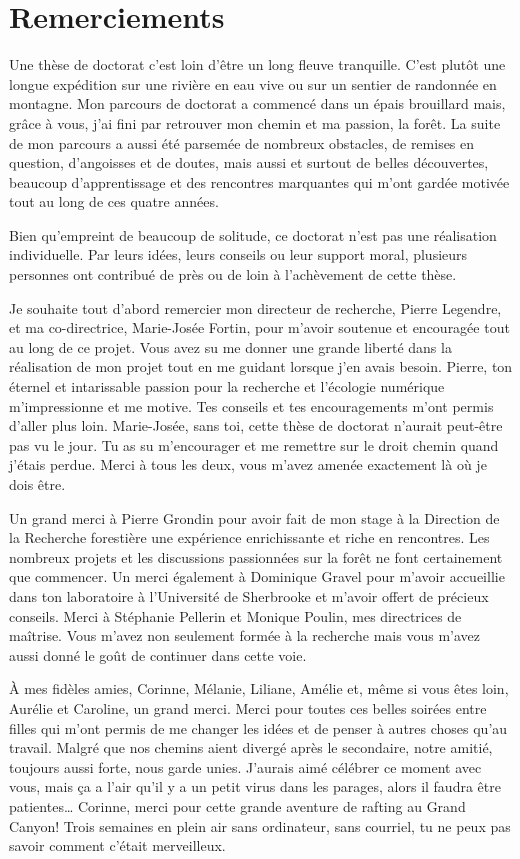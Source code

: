\francais

\chapter*{Remerciements}

Une thèse de doctorat c'est loin d'être un long fleuve tranquille. C'est
plutôt une longue expédition sur une rivière en eau vive ou sur un
sentier de randonnée en montagne. Mon parcours de doctorat a commencé
dans un épais brouillard mais, grâce à vous, j'ai fini par retrouver mon
chemin et ma passion, la forêt. La suite de mon parcours a aussi été
parsemée de nombreux obstacles, de remises en question, d'angoisses et
de doutes, mais aussi et surtout de belles découvertes, beaucoup
d'apprentissage et des rencontres marquantes qui m'ont gardée motivée
tout au long de ces quatre années.

Bien qu'empreint de beaucoup de solitude, ce doctorat n'est pas une
réalisation individuelle. Par leurs idées, leurs conseils ou leur
support moral, plusieurs personnes ont contribué de près ou de loin à
l'achèvement de cette thèse.

Je souhaite tout d'abord remercier mon directeur de recherche, Pierre
Legendre, et ma co-directrice, Marie-Josée Fortin, pour m'avoir soutenue
et encouragée tout au long de ce projet. Vous avez su me donner une
grande liberté dans la réalisation de mon projet tout en me guidant
lorsque j'en avais besoin. Pierre, ton éternel et intarissable passion
pour la recherche et l'écologie numérique m'impressionne et me motive.
Tes conseils et tes encouragements m'ont permis d'aller plus loin.
Marie-Josée, sans toi, cette thèse de doctorat n'aurait peut-être pas vu
le jour. Tu as su m'encourager et me remettre sur le droit chemin quand
j'étais perdue. Merci à tous les deux, vous m'avez amenée exactement là
où je dois être.

Un grand merci à Pierre Grondin pour avoir fait de mon stage à la
Direction de la Recherche forestière une expérience enrichissante et
riche en rencontres. Les nombreux projets et les discussions passionnées
sur la forêt ne font certainement que commencer. Un merci également à
Dominique Gravel pour m'avoir accueillie dans ton laboratoire à
l'Université de Sherbrooke et m'avoir offert de précieux conseils. Merci
à Stéphanie Pellerin et Monique Poulin, mes directrices de maîtrise.
Vous m'avez non seulement formée à la recherche mais vous m'avez aussi
donné le goût de continuer dans cette voie.

À mes fidèles amies, Corinne, Mélanie, Liliane, Amélie et, même si vous
êtes loin, Aurélie et Caroline, un grand merci. Merci pour toutes ces
belles soirées entre filles qui m'ont permis de me changer les idées et
de penser à autres choses qu'au travail. Malgré que nos chemins aient
divergé après le secondaire, notre amitié, toujours aussi forte, nous
garde unies. J'aurais aimé célébrer ce moment avec vous, mais ça a l'air
qu'il y a un petit virus dans les parages, alors il faudra être
patientes\ldots{} Corinne, merci pour cette grande aventure de rafting
au Grand Canyon! Trois semaines en plein air sans ordinateur, sans
courriel, tu ne peux pas savoir comment c'était merveilleux.

